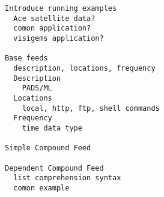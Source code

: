 \begin{verbatim}
Introduce running examples
  Ace satellite data?
  comon application?
  visigems application?

Base feeds
  description, locations, frequency
  Description
    PADS/ML
  Locations
    local, http, ftp, shell commands
  Frequency
    time data type

Simple Compound Feed

Dependent Compound Feed
  list comprehension syntax
  comon example

\end{verbatim}
